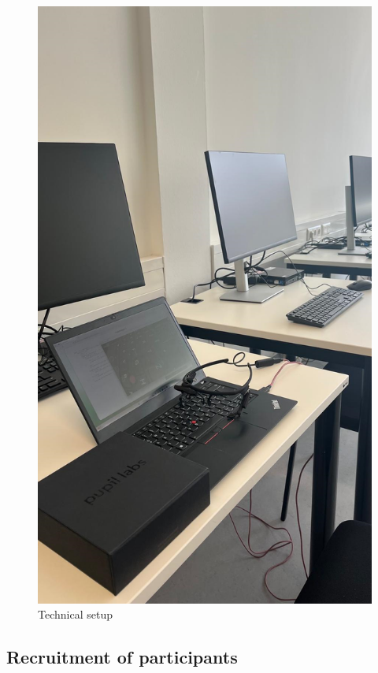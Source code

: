 \begin{figure} [H]
  \centering
  \includegraphics[scale=0.5]{figures/setup.png}
  \caption{Technical setup }
  \label{fig:AnhangsChor}
\end{figure}

\subsection{Recruitment of participants}


